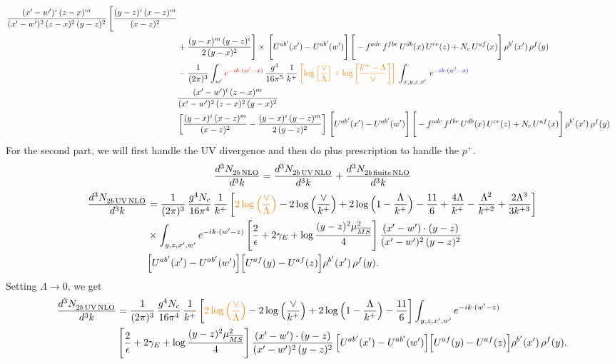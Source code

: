 \documentclass[9pt]{article}
\numberwithin{equation}{section}
\begin{document}
\begin{align}
\frac{(x'-w')^{i}\,(z-x)^{m}}{(x'-w')^{2}\,(z-x)^{2}\, (y-z)^{2}}\,\Bigg[\frac{(y-z)^{i}\,(x-z)^{m}}{(x-z)^{2}}\notag \\ & +\frac{(y-x)^{m}\,(y-z)^{i}}{2\,(y-x)^{2}}\Bigg]\times\, \Bigg[U^{ab'}(x')-U^{ab'}(w')\Bigg]\,\Bigg[-f^{adc}\,f^{fbe}\,U^{db}(x)\,U^{ce}(z)+N_{c}\,U^{af}(x)\Bigg]\,\rho^{b'}(x')\,\rho^{f}(y)\notag \\ & - \frac{1}{(2\pi)^{3}}  \int_{w^\prime} {\color{red}e^{-ik\cdot(w'-x)}}\, \frac{g^{4}}{16\pi^{5}}\,\frac{1}{k^{+}}\,{\color{orange}\left[\log{\left[\frac{\vee}{\Lambda}\right]}+\log{\left[\frac{k^{+}-\Lambda}{\vee}\right]}\right]}\, \int_{x,y,z,x'}\,{\color{blue}e^{-ik\cdot(w'-x)}}\notag \\ & \frac{(x'-w')^{i}\,(z-x)^{m}}{(x'-w')^{2}\,(z-x)^{2}\,(y-x)^{2}} \notag \\ &\left[\frac{(y-x)^{i}\,(x-z)^{m}}{(x-z)^{2}}-\frac{(y-x)^{i}\,(y-z)^{m}}{2\,(y-z)^{2}}\right]\, \Bigg[U^{ab'}(x')-U^{ab'}(w')\Bigg]\,\Bigg[-f^{adc}\,f^{fbe}\,U^{db}(x)\,U^{ce}(z)+N_{c}\,U^{af}(x)\Bigg]\,\rho^{b'}(x')\,\rho^{f}(y)
\end{align}
For the second part, we will first handle the UV divergence and then do plus prescription to handle the $p^{+}$. 
$$\frac{d^{3}N_{2b\,\rm NLO}^{\rm}}{d^{3}k} = \frac{d^{3}N_{2b\,\rm UV\, NLO}^{\rm}}{d^{3}k} + \frac{d^{3}N_{2b\,\rm finite\, NLO}^{\rm}}{d^{3}k} $$
\begin{align}
\frac{d^{3}N_{2b\,\rm UV\, NLO}^{\rm}}{d^{3}k} & = \frac{1}{(2\pi)^{3}}\,\frac{g^{4}N_{c}}{16\pi^{4}}\,\frac{1}{k^{+}}
\left[{\color{orange}2\log\Big(\frac{\vee}{\Lambda}\Big)}-2\log\Big(\frac{\vee}{k^{+}}\Big)+2\log\Big(1-\frac{\Lambda}{k^{+}}\Big)-\frac{11}{6}+\frac{4\Lambda}{k^{+}}-\frac{\Lambda^{2}}{k^{+2}}+\frac{2\Lambda^{3}}{3k^{+3}}\right]\notag\\
&\times\int_{y,z,x',w'}e^{-ik\cdot(w'-z)}\left[\frac{2}{\epsilon}+2\gamma_{E}+\log\frac{(y-z)^{2}\mu^{2}_{\overline{MS}}}{4}\right]
\frac{(x'-w')\cdot(y-z)}{(x'-w')^{2}\,(y-z)^{2}}\,\notag \\ & \Big[U^{ab'}(x')-U^{ab'}(w')\Big]\Big[U^{af}(y)-U^{af}(z)\Big]\rho^{b'}(x')\,\rho^{f}(y).
\end{align}
Setting $\Lambda\rightarrow 0$, we get
\begin{align}
\frac{d^{3}N_{2b\,\rm UV\, NLO}^{\rm}}{d^{3}k} & = \frac{1}{(2\pi)^{3}}\,\frac{g^{4}N_{c}}{16\pi^{4}}\,\frac{1}{k^{+}}
\left[{\color{orange}2\log\Big(\frac{\vee}{\Lambda}\Big)}-2\log\Big(\frac{\vee}{k^{+}}\Big)+2\log\Big(1-\frac{\Lambda}{k^{+}}\Big)-\frac{11}{6}\right]\int_{y,z,x',w'}e^{-ik\cdot(w'-z)}\notag \\ & \left[\frac{2}{\epsilon}+2\gamma_{E}+\log\frac{(y-z)^{2}\mu^{2}_{\overline{MS}}}{4}\right]
\frac{(x'-w')\cdot(y-z)}{(x'-w')^{2}\,(y-z)^{2}}\, \Big[U^{ab'}(x')-U^{ab'}(w')\Big]\Big[U^{af}(y)-U^{af}(z)\Big]\rho^{b'}(x')\,\rho^{f}(y).
\end{align}
\end{document}

